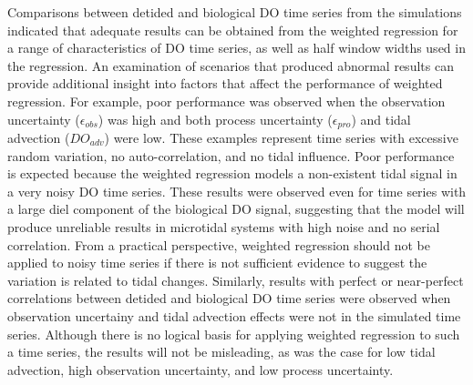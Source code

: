 \documentclass[letterpaper,12pt,oneside]{article}\usepackage[]{graphicx}\usepackage[]{color}
\begin{document}
Comparisons between detided and biological \ac{DO} time series from the simulations indicated that adequate results can be obtained from the weighted regression for a range of characteristics of \ac{DO} time series, as well as half window widths used in the regression.  An examination of scenarios that produced abnormal results can provide additional insight into factors that affect the performance of weighted regression.  For example, poor performance was observed when the observation uncertainty ($\epsilon_{obs}$) was high and both process uncertainty ($\epsilon_{pro}$) and tidal advection ($DO_{adv}$) were low.  These examples represent time series with excessive random variation, no auto-correlation, and no tidal influence.  Poor performance is expected because the weighted regression models a non-existent tidal signal in a very noisy \ac{DO} time series.  These results were observed even for time series with a large diel component of the biological \ac{DO} signal, suggesting that the model will produce unreliable results in microtidal systems with high noise and no serial correlation.  From a practical perspective, weighted regression should not be applied to noisy time series if there is not sufficient evidence to suggest the variation is related to tidal changes.  Similarly, results with perfect or near-perfect correlations between detided and biological \ac{DO} time series were observed when observation uncertainy and tidal advection effects were not in the simulated time series.  Although there is no logical basis for applying weighted regression to such a time series, the results will not be misleading, as was the case for low tidal advection, high observation uncertainty, and low process uncertainty.  
\end{document}

